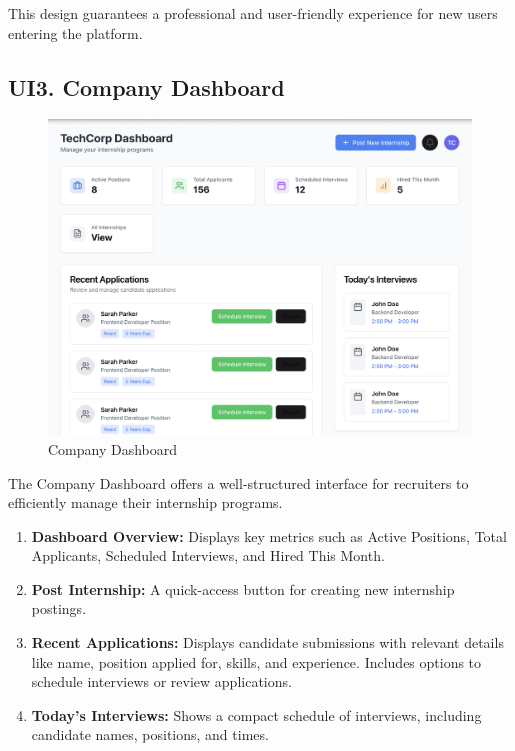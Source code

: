 This design guarantees a professional and user-friendly experience for new users entering the platform.

\subsection{UI3. Company Dashboard}
\label{subsec:company_dashboard_ui}%

\begin{figure}[H]
    \begin{center}
        \includegraphics[width=0.82\linewidth]{JhaBhatiaSharma/imagesDD/CompanyDashboard.png}
        \caption{Company Dashboard}
        \label{fig:companyDashboard}
    \end{center}
\end{figure}

The Company Dashboard offers a well-structured interface for recruiters to efficiently manage their internship programs.

\begin{enumerate}
    \item \textbf{Dashboard Overview:} Displays key metrics such as Active Positions, Total Applicants, Scheduled Interviews, and Hired This Month.
    \item \textbf{Post Internship:} A quick-access button for creating new internship postings.
    \item \textbf{Recent Applications:} Displays candidate submissions with relevant details like name, position applied for, skills, and experience. Includes options to schedule interviews or review applications.
    \item \textbf{Today's Interviews:} Shows a compact schedule of interviews, including candidate names, positions, and times.
\end{enumerate}

